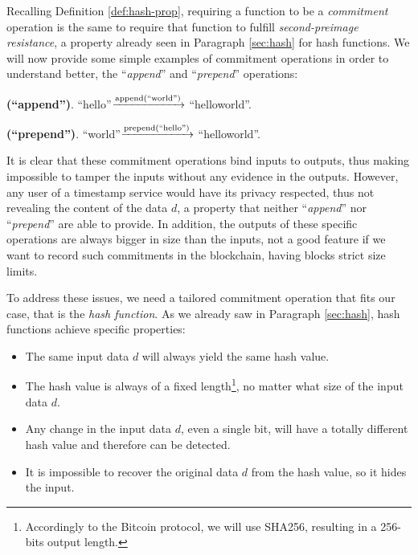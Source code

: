 \bigskip
\noindent
Recalling Definition \ref{def:hash-prop}, requiring a function to be a \textit{commitment} operation is the same to require that function to fulfill \textit{second-preimage resistance}, a property already seen in Paragraph \ref{sec:hash} for hash functions. We will now provide some simple examples of commitment operations in order to understand better, the \enquote{\textit{append}} and \enquote{\textit{prepend}} operations:
\begin{myexample}{\bf (\enquote{append})}.
    \textquotedblleft hello\textquotedblright $\xrightarrow{\text{append(\textquotedblleft world\textquotedblright)}}$ \textquotedblleft helloworld\textquotedblright.
\end{myexample}
\begin{myexample}{\bf (\enquote{prepend})}.
    \textquotedblleft world\textquotedblright $\xrightarrow{\text{prepend(\textquotedblleft hello\textquotedblright)}}$ \textquotedblleft helloworld\textquotedblright.
\end{myexample}

\bigskip
\noindent
It is clear that these commitment operations bind inputs to outputs, thus making impossible to tamper the inputs without any evidence in the outputs. However, any user of a timestamp service would have its privacy respected, thus not revealing the content of the data $d$, a property that neither \enquote{\textit{append}} nor \enquote{\textit{prepend}} are able to provide. In addition, the outputs of these specific operations are always bigger in size than the inputs, not a good feature if we want to record such commitments in the blockchain, having blocks strict size limits.

\bigskip
\noindent
To address these issues, we need a tailored commitment operation that fits our case, that is the \textit{hash function}. As we already saw in Paragraph \ref{sec:hash}, hash functions achieve specific properties:
\begin{itemize}
    \item The same input data $d$ will always yield the same hash value.
    \item The hash value is always of a fixed length\footnote{Accordingly to the Bitcoin protocol, we will use SHA256, resulting in a 256-bits output length.}, no matter what size of the input data $d$.
    \item Any change in the input data $d$, even a single bit, will have a totally different hash value and therefore can be detected.
    \item It is impossible to recover the original data $d$ from the hash value, so it hides the input.
\end{itemize}

